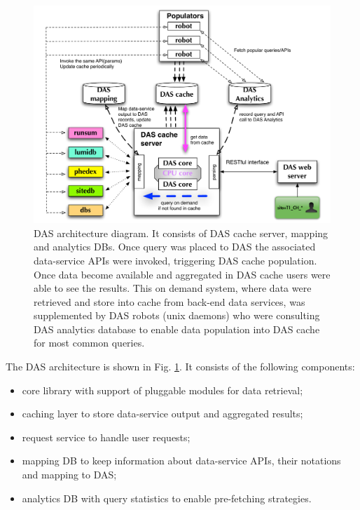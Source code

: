 \documentclass[a4paper]{jpconf}
\begin{document}
\begin{figure}[htb]
\centering
\includegraphics[width=150mm]{DAS_Cache_and_Analytics.pdf}
\caption{
DAS architecture diagram. It consists of DAS cache server, mapping and analytics DBs.
Once query was placed to DAS the associated
data-service APIs were invoked, triggering DAS cache population. Once data become
available and aggregated in DAS cache users were able to see the results. This on demand
system, where data were retrieved and store into cache from
back-end data services, was supplemented by DAS robots (unix daemons) who
were consulting DAS analytics database to enable data population into DAS
cache for most common queries.
}
\label{DAS_cache}
\end{figure}

\noindent
The DAS architecture is shown in Fig. \ref{DAS_cache}. It consists of the
following components:
\begin{itemize}
\item core library with support of pluggable modules for data retrieval;
\item caching layer to store data-service output and aggregated results;
\item request service to handle user requests;
\item mapping DB to keep information about data-service APIs, their
notations and mapping to DAS;
\item analytics DB with query statistics to enable pre-fetching 
strategies.
\end{itemize}
\end{document}
